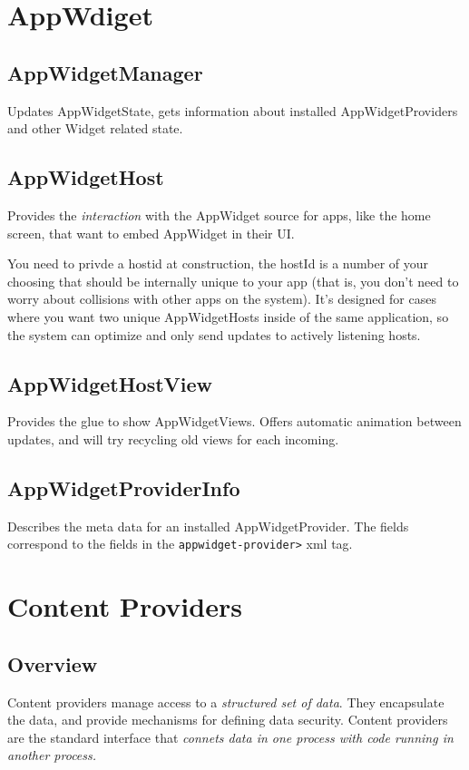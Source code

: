 \documentclass[11pt, a4paper]{book}
\begin{document}
\section{AppWdiget}

\subsection{AppWidgetManager}
Updates AppWidgetState, gets information about installed AppWidgetProviders and
other Widget related state.
\subsection{AppWidgetHost}
Provides the \emph{interaction} with the AppWidget source for apps, like the
home screen, that want to embed AppWidget in their UI.

You need to privde a hostid at construction, the hostId is a number of your 
choosing that should be internally unique to your app (that is, you don't 
need to worry about collisions with other apps on the system).  It's designed 
for cases where you want two unique AppWidgetHosts inside of the same 
application, so the system can optimize and only send updates to actively 
listening hosts. 

\subsection{AppWidgetHostView}
Provides the glue to show AppWidgetViews. Offers automatic animation between
updates, and will try recycling old views for each incoming.
\subsection{AppWidgetProviderInfo}
Describes the meta data for an installed AppWidgetProvider. The fields
correspond to the fields in the \verb|appwidget-provider>| xml tag.


\section{Content Providers}
\subsection{Overview}
Content providers manage access to a \emph{structured set of data}. They
encapsulate the data, and provide mechanisms for defining data security. Content
providers are the standard interface that \emph{connets data in one process with
code running in another process.}
\end{document}
